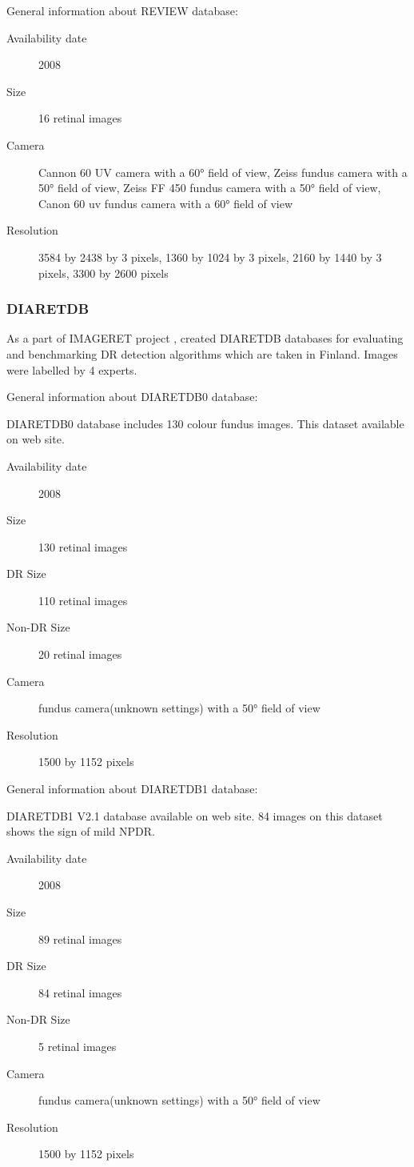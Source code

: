 General information about REVIEW database:
\begin{description}
    \item[Availability date] 2008
    \item[Size] 16 retinal images
    \item[Camera] Cannon 60 UV camera with a 60° field of view, Zeiss fundus camera with a 50° field of view, Zeiss  FF 450 fundus  camera with a 50°  field of view, Canon 60 uv fundus  camera with a 60° field of view
    \item[Resolution] 3584 by 2438 by 3 pixels, 1360 by 1024 by 3 pixels, 2160 by 1440 by 3 pixels, 3300 by 2600 pixels
\end{description}

\subsubsection{DIARETDB}

As a part of IMAGERET project \citep{IMAGERET}, \citet{kauppi2013constructing} created DIARETDB databases \citep{DIARETDB0} \citep{DIARETDB1V2_1} for evaluating and benchmarking DR detection algorithms which are taken in Finland. Images were labelled by 4 experts.

General information about DIARETDB0 database:

DIARETDB0 database includes 130 colour fundus images. This dataset available on \citet{DIARETDB0} web site.

\begin{description}
    \item[Availability date] 2008
    \item[Size] 130 retinal images
    \item[DR Size] 110 retinal images
    \item[Non-DR Size] 20 retinal images
    \item[Camera] fundus camera(unknown settings) with a 50° field of view
    \item[Resolution] 1500 by 1152 pixels
\end{description}

General information about DIARETDB1 database:

DIARETDB1 V2.1 database \citep{kauppi2007diaretdb1} available on \citet{DIARETDB1V2_1} web site. 84 images on this dataset shows the sign of mild NPDR. 

\begin{description}
    \item[Availability date] 2008
    \item[Size] 89 retinal images
    \item[DR Size] 84 retinal images
    \item[Non-DR Size] 5 retinal images
    \item[Camera] fundus camera(unknown settings) with a 50° field of view
    \item[Resolution] 1500 by 1152 pixels
\end{description}


